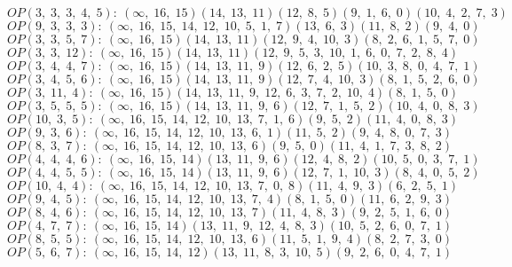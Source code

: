$OP(3, \;3, \;3, \;4, \;5): \:(\infty, \;16, \;15)(14, \;13, \;11)(12, \;8, \;5)(9, \;1, \;6, \;0)(10, \;4, \;2, \;7, \;3)$\\
$OP(9, \;3, \;3, \;3): \:(\infty, \;16, \;15, \;14, \;12, \;10, \;5, \;1, \;7)(13, \;6, \;3)(11, \;8, \;2)(9, \;4, \;0)$\\
$OP(3, \;3, \;5, \;7): \:(\infty, \;16, \;15)(14, \;13, \;11)(12, \;9, \;4, \;10, \;3)(8, \;2, \;6, \;1, \;5, \;7, \;0)$\\
$OP(3, \;3, \;12): \:(\infty, \;16, \;15)(14, \;13, \;11)(12, \;9, \;5, \;3, \;10, \;1, \;6, \;0, \;7, \;2, \;8, \;4)$\\
$OP(3, \;4, \;4, \;7): \:(\infty, \;16, \;15)(14, \;13, \;11, \;9)(12, \;6, \;2, \;5)(10, \;3, \;8, \;0, \;4, \;7, \;1)$\\
$OP(3, \;4, \;5, \;6): \:(\infty, \;16, \;15)(14, \;13, \;11, \;9)(12, \;7, \;4, \;10, \;3)(8, \;1, \;5, \;2, \;6, \;0)$\\
$OP(3, \;11, \;4): \:(\infty, \;16, \;15)(14, \;13, \;11, \;9, \;12, \;6, \;3, \;7, \;2, \;10, \;4)(8, \;1, \;5, \;0)$\\
$OP(3, \;5, \;5, \;5): \:(\infty, \;16, \;15)(14, \;13, \;11, \;9, \;6)(12, \;7, \;1, \;5, \;2)(10, \;4, \;0, \;8, \;3)$\\
$OP(10, \;3, \;5): \:(\infty, \;16, \;15, \;14, \;12, \;10, \;13, \;7, \;1, \;6)(9, \;5, \;2)(11, \;4, \;0, \;8, \;3)$\\
$OP(9, \;3, \;6): \:(\infty, \;16, \;15, \;14, \;12, \;10, \;13, \;6, \;1)(11, \;5, \;2)(9, \;4, \;8, \;0, \;7, \;3)$\\
$OP(8, \;3, \;7): \:(\infty, \;16, \;15, \;14, \;12, \;10, \;13, \;6)(9, \;5, \;0)(11, \;4, \;1, \;7, \;3, \;8, \;2)$\\
$OP(4, \;4, \;4, \;6): \:(\infty, \;16, \;15, \;14)(13, \;11, \;9, \;6)(12, \;4, \;8, \;2)(10, \;5, \;0, \;3, \;7, \;1)$\\
$OP(4, \;4, \;5, \;5): \:(\infty, \;16, \;15, \;14)(13, \;11, \;9, \;6)(12, \;7, \;1, \;10, \;3)(8, \;4, \;0, \;5, \;2)$\\
$OP(10, \;4, \;4): \:(\infty, \;16, \;15, \;14, \;12, \;10, \;13, \;7, \;0, \;8)(11, \;4, \;9, \;3)(6, \;2, \;5, \;1)$\\
$OP(9, \;4, \;5): \:(\infty, \;16, \;15, \;14, \;12, \;10, \;13, \;7, \;4)(8, \;1, \;5, \;0)(11, \;6, \;2, \;9, \;3)$\\
$OP(8, \;4, \;6): \:(\infty, \;16, \;15, \;14, \;12, \;10, \;13, \;7)(11, \;4, \;8, \;3)(9, \;2, \;5, \;1, \;6, \;0)$\\
$OP(4, \;7, \;7): \:(\infty, \;16, \;15, \;14)(13, \;11, \;9, \;12, \;4, \;8, \;3)(10, \;5, \;2, \;6, \;0, \;7, \;1)$\\
$OP(8, \;5, \;5): \:(\infty, \;16, \;15, \;14, \;12, \;10, \;13, \;6)(11, \;5, \;1, \;9, \;4)(8, \;2, \;7, \;3, \;0)$\\
$OP(5, \;6, \;7): \:(\infty, \;16, \;15, \;14, \;12)(13, \;11, \;8, \;3, \;10, \;5)(9, \;2, \;6, \;0, \;4, \;7, \;1)$\\

